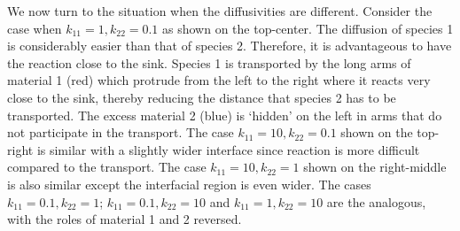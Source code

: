 \documentclass[11pt]{article}
\begin{document}
We now turn to the situation when the diffusivities are different.  Consider the case when $k_{11} = 1, k_{22} = 0.1$ as shown on the top-center.  The diffusion of species 1 is considerably easier than that of species 2.  Therefore, it is advantageous to have the reaction close to the sink.  Species 1 is transported by the long arms of material 1 (red) which protrude from the left to the right where it reacts very close to the sink, thereby reducing the distance that species 2 has to be transported.  The excess material 2 (blue) is `hidden' on the left in arms that do not participate in the transport.  The case $k_{11} = 10, k_{22} = 0.1$ shown on the top-right is similar with a slightly wider interface since reaction is more difficult compared to the transport. The case $k_{11} = 10, k_{22} = 1$ shown on the right-middle is also similar except the interfacial region is even wider.  The cases $k_{11} = 0.1, k_{22} = 1$; $k_{11} = 0.1, k_{22} = 10$ and $k_{11} = 1, k_{22} = 10$ are the analogous, with the roles of material 1 and 2 reversed.



\end{document}
